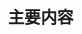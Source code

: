 \documentclass{beamer}
\begin{document}
\begin{CJK}{UTF8}{gbsn}     %

	\title{}
	\author{胡庆海}
	\date{}

    \begin{frame}
        \frametitle{主要内容}
    \end{frame}

\end{CJK}
\end{document}
